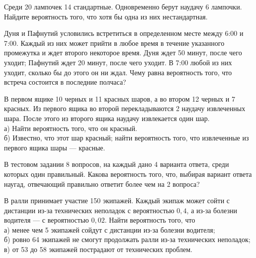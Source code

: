 \newpage\setcounter{zad}{0}



\begin{zkrW}{20}\noindent 
	Среди 20 лампочек 14 стандартные. Одновременно берут наудачу 6 лампочки. Найдите вероятность того, что хотя бы одна из них нестандартная.
 
\end{zkrW}

\begin{zkrW}{20}\noindent 
	Дуня и Пафнутий условились встретиться в определенном месте между 6:00 и 7:00. Каждый из них может прийти в любое время в течение указанного промежутка и ждет второго некоторое время. Дуня ждет 50 минут, после чего уходит; Пафнутий ждет 20 минут, после чего уходит. В 7:00 любой из них уходит, сколько бы до этого он ни ждал. Чему равна вероятность того, что встреча состоится в последние полчаса?
 
\end{zkrW}

\begin{zkrW}{20}\noindent 
	В первом ящике 10 черных и 11 красных шаров, а во втором 12 черных и 7 красных. Из первого ящика во второй перекладываются 2 наудачу извлеченных шара. После этого из второго ящика наудачу извлекается один шар. \\ \indent а) Найти вероятность того, что он красный. \\ \indent б) Известно, что этот шар красный; найти вероятность того, что извлеченные из первого ящика шары --- красные.
 
\end{zkrW}

\begin{zkrW}{20}\noindent 
	В тестовом задании 8 вопросов, на каждый дано 4 варианта ответа, среди которых один правильный. Какова вероятность того, что, выбирая вариант ответа наугад, отвечающий правильно ответит более чем на 2 вопроса?
 
\end{zkrW}

\begin{zkrW}{20}\noindent 
	В ралли принимает участие 150 экипажей. Каждый экипаж может сойти с дистанции из-за технических неполадок с вероятностью $0{,}4$, а из-за болезни водителя --- с вероятностью $0{,}02$. Найти вероятность того, что \\ \indent а) менее чем 5 экипажей сойдут с дистанции из-за болезни водителя; \\ \indent б) ровно 64 экипажей не смогут продолжать ралли из-за технических неполадок; \\ \indent в) от 53 до 58 экипажей пострадают от технических проблем.
 
\end{zkrW}


